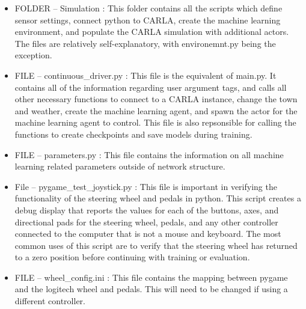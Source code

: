 \documentclass[12pt,oneside,letterpaper]{article}
\begin{document}
\begin{itemize}
\item FOLDER -- Simulation : This folder contains all the scripts which define sensor settings, connect python to CARLA, create the machine learning environment, and populate the CARLA simulation with additional actors. The files are relatively self-explanatory, with environemnt.py being the exception.
\item FILE -- continuous\_driver.py : This file is the equivalent of main.py. It contains all of the information regarding user argument tags, and calls all other necessary functions to connect to a CARLA instance, change the town and weather, create the machine learning agent, and spawn the actor for the machine learning agent to control. This file is also repsonsible for calling the functions to create checkpoints and save models during training.
\item FILE -- parameters.py : This file contains the information on all machine learning related parameters outside of network structure.
\item File -- pygame\_test\_joystick.py : This file is important in verifying the functionality of the steering wheel and pedals in python. This script creates a debug display that reports the values for each of the buttons, axes, and directional pads for the steering wheel, pedals, and any other controller connected to the computer that is not a mouse and keyboard. The most common uses of this script are to verify that the steering wheel has returned to a zero position before continuing with training or evaluation.
\item FILE -- wheel\_config.ini : This file contains the mapping between pygame and the logitech wheel and pedals. This will need to be changed if using a different controller.

\end{itemize}
\end{document}
